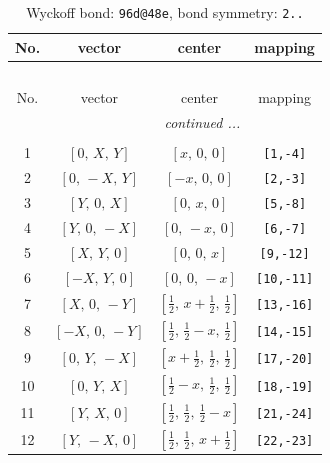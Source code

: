 \documentclass[fleqn,8pt]{jsarticle}
\begin{document}
\begin{longtable}{cccc}
\caption{Wyckoff bond: {\tt 96d@48e}, bond symmetry: {\tt 2..}}
 \\
 \hline \hline
No. & vector & center & mapping \\ \hline \endfirsthead

\multicolumn{3}{l}{\tablename\ \thetable{}} \\
 \hline \hline
No. & vector & center & mapping \\ \hline \endhead

 \hline \hline
\multicolumn{3}{r}{\footnotesize\it continued ...} \\ \endfoot

 \hline \hline
\multicolumn{3}{r}{} \\ \endlastfoot

1 & $\left[ 0,\, X,\, Y \right]$ & $\left[ x,\, 0,\, 0 \right]$ & {\tt [1,-4]} \\ \hline
2 & $\left[ 0,\, - X,\, Y \right]$ & $\left[ - x,\, 0,\, 0 \right]$ & {\tt [2,-3]} \\ \hline
3 & $\left[ Y,\, 0,\, X \right]$ & $\left[ 0,\, x,\, 0 \right]$ & {\tt [5,-8]} \\ \hline
4 & $\left[ Y,\, 0,\, - X \right]$ & $\left[ 0,\, - x,\, 0 \right]$ & {\tt [6,-7]} \\ \hline
5 & $\left[ X,\, Y,\, 0 \right]$ & $\left[ 0,\, 0,\, x \right]$ & {\tt [9,-12]} \\ \hline
6 & $\left[ - X,\, Y,\, 0 \right]$ & $\left[ 0,\, 0,\, - x \right]$ & {\tt [10,-11]} \\ \hline
7 & $\left[ X,\, 0,\, - Y \right]$ & $\left[ \frac{1}{2},\, x + \frac{1}{2},\, \frac{1}{2} \right]$ & {\tt [13,-16]} \\ \hline
8 & $\left[ - X,\, 0,\, - Y \right]$ & $\left[ \frac{1}{2},\, \frac{1}{2} - x,\, \frac{1}{2} \right]$ & {\tt [14,-15]} \\ \hline
9 & $\left[ 0,\, Y,\, - X \right]$ & $\left[ x + \frac{1}{2},\, \frac{1}{2},\, \frac{1}{2} \right]$ & {\tt [17,-20]} \\ \hline
10 & $\left[ 0,\, Y,\, X \right]$ & $\left[ \frac{1}{2} - x,\, \frac{1}{2},\, \frac{1}{2} \right]$ & {\tt [18,-19]} \\ \hline
11 & $\left[ Y,\, X,\, 0 \right]$ & $\left[ \frac{1}{2},\, \frac{1}{2},\, \frac{1}{2} - x \right]$ & {\tt [21,-24]} \\ \hline
12 & $\left[ Y,\, - X,\, 0 \right]$ & $\left[ \frac{1}{2},\, \frac{1}{2},\, x + \frac{1}{2} \right]$ & {\tt [22,-23]} \\ \hline

\end{longtable}
\end{document}
